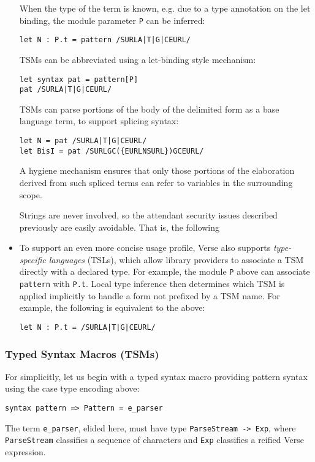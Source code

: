 \begin{itemize}
When the type of the term is known, e.g. due to a type annotation on the let binding, the module parameter \lstinline{P} can be inferred:
\begin{lstlisting}[numbers=none]
let N : P.t = pattern /SURLA|T|G|CEURL/
\end{lstlisting}

TSMs can be abbreviated using a let-binding style mechanism:
\begin{lstlisting}[numbers=none]
let syntax pat = pattern[P]
pat /SURLA|T|G|CEURL/
\end{lstlisting}

TSMs can parse portions of the body of the delimited form as a base language term, to support splicing syntax:
\begin{lstlisting}[numbers=none]
let N = pat /SURLA|T|G|CEURL/
let BisI = pat /SURLGC({EURLNSURL})GCEURL/
\end{lstlisting}
A hygiene mechanism ensures that only those portions of the elaboration derived from such spliced terms can refer to variables in the surrounding scope.

Strings are never involved, so the attendant security issues described previously are easily avoidable. That is, the following 

\item To support an even more concise usage profile, Verse also  supports \emph{type-specific languages} (TSLs), which allow library providers to associate a TSM directly with a declared type. For example, the module \lstinline{P} above can associate \lstinline{pattern} with \lstinline{P.t}. Local type inference then determines which TSM is applied implicitly to handle a form not prefixed by a TSM name. For example, the following is equivalent to the above:
\begin{lstlisting}[numbers=none]
let N : P.t = /SURLA|T|G|CEURL/
\end{lstlisting}
\end{itemize}
\subsubsection{Typed Syntax Macros (TSMs)}\label{sec:tsms}
For simplicitly, let us begin with a typed syntax macro providing pattern syntax using the case type encoding above:
\begin{lstlisting}[numbers=none]
syntax pattern => Pattern = e_parser
\end{lstlisting}
The term \lstinline{e_parser}, elided here, must have type \lstinline{ParseStream -> Exp}, where \lstinline{ParseStream} classifies a sequence of characters and \lstinline{Exp} classifies a reified Verse expression. 

